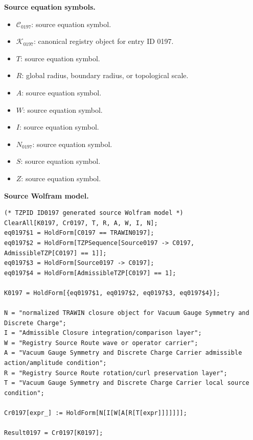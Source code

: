 \begin{minipage}[t]{0.49\linewidth}
\begingroup
\small
\raggedright
\textbf{Source equation symbols.}\par
\begin{itemize}[leftmargin=1.35em,itemsep=1pt,topsep=1pt,parsep=0pt]
    \item $\mathcal{C}_{0197}$: source equation symbol.
    \item $\mathcal{K}_{0197}$: canonical registry object for entry ID 0197.
    \item $T$: source equation symbol.
    \item $R$: global radius, boundary radius, or topological scale.
    \item $A$: source equation symbol.
    \item $W$: source equation symbol.
    \item $I$: source equation symbol.
    \item $N_{0197}$: source equation symbol.
    \item $S$: source equation symbol.
    \item $Z$: source equation symbol.
\end{itemize}
\endgroup
\end{minipage}\hfill
\begin{minipage}[t]{0.47\linewidth}
\begingroup
\scriptsize
\raggedright
\textbf{Source Wolfram model.}\par
\begin{Verbatim}[fontsize=\tiny,breaklines=true,breakanywhere=true]
(* TZPID ID0197 generated source Wolfram model *)
ClearAll[K0197, Cr0197, T, R, A, W, I, N];
eq0197$1 = HoldForm[C0197 == TRAWIN0197];
eq0197$2 = HoldForm[TZPSequence[Source0197 -> C0197, AdmissibleTZP[C0197] == 1]];
eq0197$3 = HoldForm[Source0197 -> C0197];
eq0197$4 = HoldForm[AdmissibleTZP[C0197] == 1];

K0197 = HoldForm[{eq0197$1, eq0197$2, eq0197$3, eq0197$4}];

N = "normalized TRAWIN closure object for Vacuum Gauge Symmetry and Discrete Charge";
I = "Admissible Closure integration/comparison layer";
W = "Registry Source Route wave or operator carrier";
A = "Vacuum Gauge Symmetry and Discrete Charge Carrier admissible action/amplitude condition";
R = "Registry Source Route rotation/curl preservation layer";
T = "Vacuum Gauge Symmetry and Discrete Charge Carrier local source condition";

Cr0197[expr_] := HoldForm[N[I[W[A[R[T[expr]]]]]]];

Result0197 = Cr0197[K0197];
\end{Verbatim}
\endgroup
\end{minipage}

